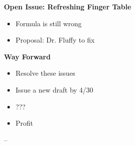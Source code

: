 \documentclass[helvetica]{seminar}
\newcommand{\heading}[1]{%
  \begin{center} 
    \large\bf 
    #1 
  \end{center} 
  \vspace{.4 in}}
\begin{document}
\begin{slide}
\heading{Open Issue: Refreshing Finger Table}

\begin{itemize}
\item Formula is still wrong
\item Proposal: Dr. Fluffy to fix
\end{itemize}



\end{slide}


\begin{slide}
\heading{Way Forward}

\begin{itemize}

\item Resolve these issues
\item Issue a new draft by 4/30
\item ???
\item Profit
\end{itemize}

\end{slide}


  -- 
\end{document}
